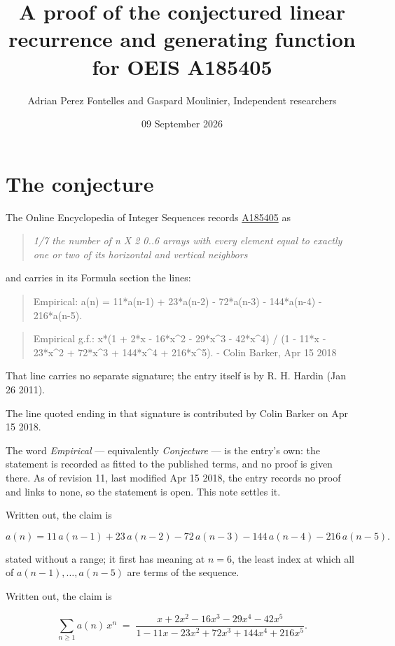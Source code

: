 \documentclass[11pt]{article}
\title{A proof of the conjectured linear recurrence and generating function for OEIS A185405}
\author{Adrian Perez Fontelles and Gaspard Moulinier, Independent researchers}
\date{09 September 2026}
\theoremstyle{definition}
\begin{document}
\maketitle
\section{The conjecture}

The Online Encyclopedia of Integer Sequences records \href{https://oeis.org/A185405}{A185405} as

\begin{quote}\itshape 1/7 the number of n X 2 0..6 arrays with every element equal to exactly one or two of its horizontal and vertical neighbors\end{quote}

and carries in its Formula section the lines:

\begin{quote}\ttfamily Empirical: a(n) = 11*a(n-1) + 23*a(n-2) - 72*a(n-3) - 144*a(n-4) - 216*a(n-5).\end{quote}

\begin{quote}\ttfamily Empirical g.f.: x*(1 + 2*x - 16*x\textasciicircum{}2 - 29*x\textasciicircum{}3 - 42*x\textasciicircum{}4) / (1 - 11*x - 23*x\textasciicircum{}2 + 72*x\textasciicircum{}3 + 144*x\textasciicircum{}4 + 216*x\textasciicircum{}5). - Colin Barker, Apr 15 2018\end{quote}

That line carries no separate signature; the entry itself is by R. H. Hardin (Jan 26 2011).

The line quoted ending in that signature is contributed by Colin Barker on Apr 15 2018.

The word {\itshape Empirical} --- equivalently {\itshape Conjecture} --- is the entry's own: the statement is recorded as fitted to the published terms, and no proof is given there. As of revision 11, last modified Apr 15 2018, the entry records no proof and links to none, so the statement is open. This note settles it.

Written out, the claim is

\[a(n) = 11\,a(n-1) + 23\,a(n-2) - 72\,a(n-3) - 144\,a(n-4) - 216\,a(n-5).\]

stated without a range; it first has meaning at $n = 6$, the least index at which all of $a(n-1),\dots,a(n-5)$ are terms of the sequence.

Written out, the claim is

\[\sum_{n \ge 1} a(n)\,x^n \;=\; \frac{x + 2x^{2} - 16x^{3} - 29x^{4} - 42x^{5}}{1 - 11x - 23x^{2} + 72x^{3} + 144x^{4} + 216x^{5}}.\]
\end{document}
